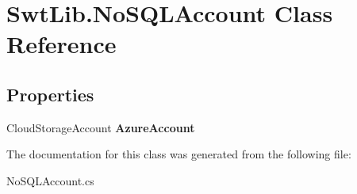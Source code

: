 \hypertarget{class_swt_lib_1_1_no_s_q_l_account}{\section{Swt\-Lib.\-No\-S\-Q\-L\-Account Class Reference}
\label{class_swt_lib_1_1_no_s_q_l_account}
}
\subsection*{Properties}
\begin{DoxyCompactItemize}
\item 
\hypertarget{class_swt_lib_1_1_no_s_q_l_account_a4e29bf49b2096d0c31dc492907d472b2}{Cloud\-Storage\-Account {\bfseries Azure\-Account}}\label{class_swt_lib_1_1_no_s_q_l_account_a4e29bf49b2096d0c31dc492907d472b2}

\end{DoxyCompactItemize}


The documentation for this class was generated from the following file\-:\begin{DoxyCompactItemize}
\item 
No\-S\-Q\-L\-Account.\-cs\end{DoxyCompactItemize}

